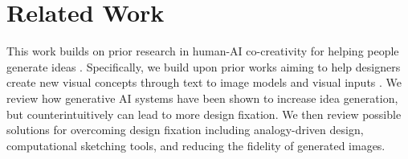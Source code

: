 \documentclass[sigconf, screen]{acmart}
\begin{document}
\section{Related Work}

This work builds on prior research in human-AI co-creativity for helping people generate ideas \cite{lin2023beyond}.
Specifically, we build upon prior works aiming to help designers create new visual concepts through text to image models and visual inputs \cite{liu2023generative,hou2024c2ideas,lin2023jigsaw}.
We review how generative AI systems have been shown to increase idea generation, but counterintuitively can lead to more design fixation.
We then review possible solutions for overcoming design fixation including analogy-driven design, computational sketching tools, and reducing the fidelity of generated images.



\end{document}
